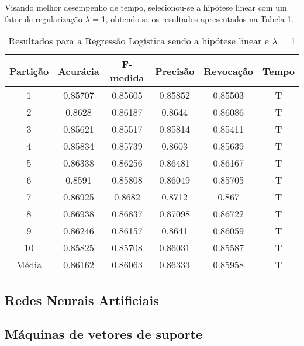 Visando melhor desempenho de tempo, selecionou-se a hipótese linear com um fator de regularização \(\lambda\)  = 1, obtendo-se os resultados apresentados na Tabela \ref{table:resultadosRL}.


\begin{table}[h]
\centering
\caption{Resultados para a Regressão Logística sendo a hipótese linear e \(\lambda\) = 1}
\vspace{0.2cm}
\begin{tabular}{c|c|c|c|c|c}
Partição & Acurácia & F-medida & Precisão & Revocação & Tempo \\
\hline
1  & 0.85707 & 0.85605 & 0.85852 & 0.85503 & T \\      
2  & 0.8628  & 0.86187 & 0.8644  & 0.86086 & T \\      
3  & 0.85621 & 0.85517 & 0.85814 & 0.85411 & T \\      
4  & 0.85834 & 0.85739 & 0.8603  & 0.85639 & T \\      
5  & 0.86338 & 0.86256 & 0.86481 & 0.86167 & T \\      
6  & 0.8591  & 0.85808 & 0.86049 & 0.85705 & T \\      
7  & 0.86925 & 0.8682  & 0.8712  & 0.867   & T \\    
8  & 0.86938 & 0.86837 & 0.87098 & 0.86722 & T \\      
9  & 0.86246 & 0.86157 & 0.8641  & 0.86059 & T \\      
10 & 0.85825 & 0.85708 & 0.86031 & 0.85587 & T \\
\hline
Média & 0.86162 & 0.86063 & 0.86333 & 0.85958 & T 

\end{tabular} 
\label{table:resultadosRL}
\end{table}

\subsection{Redes Neurais Artificiais}

\subsection{Máquinas de vetores de suporte}

